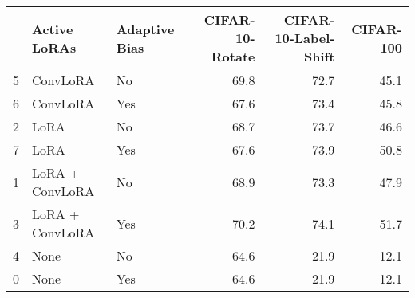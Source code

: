 \begin{tabular}{lllrrr}
\toprule
 & Active LoRAs & Adaptive Bias & CIFAR-10-Rotate & CIFAR-10-Label-Shift & CIFAR-100 \\
\midrule
5 & ConvLoRA & No & 69.8 & 72.7 & 45.1 \\
6 & ConvLoRA & Yes & 67.6 & 73.4 & 45.8 \\
2 & LoRA & No & 68.7 & 73.7 & 46.6 \\
7 & LoRA & Yes & 67.6 & 73.9 & 50.8 \\
1 & LoRA + ConvLoRA & No & 68.9 & 73.3 & 47.9 \\
3 & LoRA + ConvLoRA & Yes & 70.2 & 74.1 & 51.7 \\
4 & None & No & 64.6 & 21.9 & 12.1 \\
0 & None & Yes & 64.6 & 21.9 & 12.1 \\
\bottomrule
\end{tabular}
